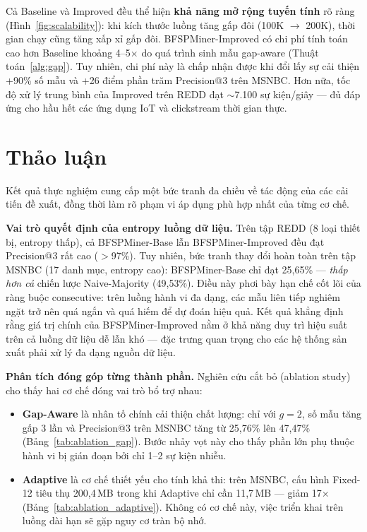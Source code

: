 \documentclass{article}
\begin{document}
Cả Baseline và Improved đều thể hiện \textbf{khả năng mở rộng tuyến tính} rõ ràng (Hình~\ref{fig:scalability}): khi kích thước luồng tăng gấp đôi (100K $\rightarrow$ 200K), thời gian chạy cũng tăng xấp xỉ gấp đôi. BFSPMiner-Improved có chi phí tính toán cao hơn Baseline khoảng 4--5$\times$ do quá trình sinh mẫu gap-aware (Thuật toán~\ref{alg:gap}). Tuy nhiên, chi phí này là chấp nhận được khi đổi lấy sự cải thiện +90\% số mẫu và +26 điểm phần trăm Precision@3 trên MSNBC. Hơn nữa, tốc độ xử lý trung bình của Improved trên REDD đạt $\sim$7.100 sự kiện/giây --- đủ đáp ứng cho hầu hết các ứng dụng IoT và clickstream thời gian thực.

\section{Thảo luận}
\label{sec:discussion}

Kết quả thực nghiệm cung cấp một bức tranh đa chiều về tác động của các cải tiến đề xuất, đồng thời làm rõ phạm vi áp dụng phù hợp nhất của từng cơ chế.

\textbf{Vai trò quyết định của entropy luồng dữ liệu.} Trên tập REDD (8 loại thiết bị, entropy thấp), cả BFSPMiner-Base lẫn BFSPMiner-Improved đều đạt Precision@3 rất cao ($>$97\%). Tuy nhiên, bức tranh thay đổi hoàn toàn trên tập MSNBC (17 danh mục, entropy cao): BFSPMiner-Base chỉ đạt 25,65\% --- \textit{thấp hơn cả} chiến lược Naive-Majority (49,53\%). Điều này phơi bày hạn chế cốt lõi của ràng buộc consecutive: trên luồng hành vi đa dạng, các mẫu liên tiếp nghiêm ngặt trở nên quá ngắn và quá hiếm để dự đoán hiệu quả. Kết quả khẳng định rằng giá trị chính của BFSPMiner-Improved nằm ở khả năng duy trì hiệu suất trên cả luồng dữ liệu dễ lẫn khó --- đặc trưng quan trọng cho các hệ thống sản xuất phải xử lý đa dạng nguồn dữ liệu.

\textbf{Phân tích đóng góp từng thành phần.} Nghiên cứu cắt bỏ (ablation study) cho thấy hai cơ chế đóng vai trò bổ trợ nhau:
\begin{itemize}
    \item \textbf{Gap-Aware} là nhân tố chính cải thiện chất lượng: chỉ với $g = 2$, số mẫu tăng gấp 3 lần và Precision@3 trên MSNBC tăng từ 25,76\% lên 47,47\% (Bảng~\ref{tab:ablation_gap}). Bước nhảy vọt này cho thấy phần lớn phụ thuộc hành vi bị gián đoạn bởi chỉ 1--2 sự kiện nhiễu.
    \item \textbf{Adaptive} là cơ chế thiết yếu cho tính khả thi: trên MSNBC, cấu hình Fixed-12 tiêu thụ 200,4\,MB trong khi Adaptive chỉ cần 11,7\,MB --- giảm 17$\times$ (Bảng~\ref{tab:ablation_adaptive}). Không có cơ chế này, việc triển khai trên luồng dài hạn sẽ gặp nguy cơ tràn bộ nhớ.
\end{itemize}
\end{document}
